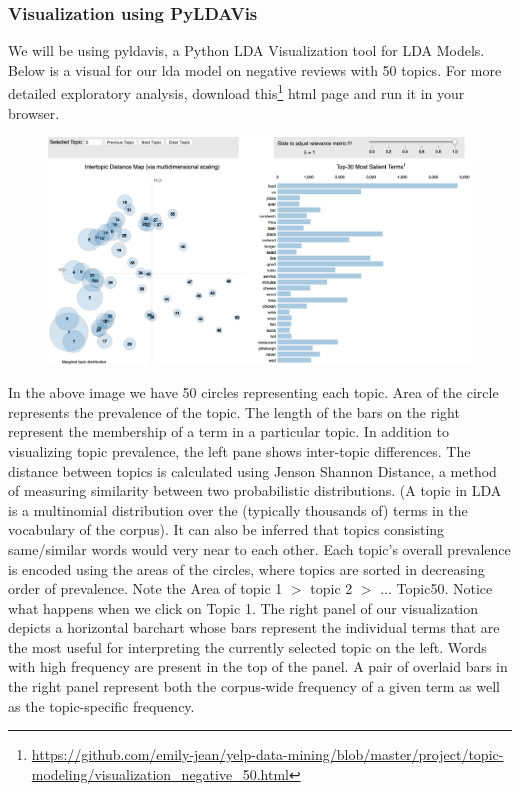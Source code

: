 \documentclass{neu_handout}
\begin{document}
\subsubsection*{Visualization using PyLDAVis}
We will be using pyldavis, a Python LDA Visualization tool for LDA Models. Below is a visual for our lda model on negative reviews with 50 topics. For more detailed exploratory analysis, download this\footnote{\url{https://github.com/emily-jean/yelp-data-mining/blob/master/project/topic-modeling/visualization_negative_50.html}} html page and run it in your browser.

\begin{figure}[h]
\centering
{
\includegraphics[width=0.6\linewidth]{first_image}
}
\end{figure}

In the above image we have 50 circles representing each topic. Area of the circle represents the prevalence of the topic. The length of the bars on the right represent the membership of a term in a particular topic. In addition to visualizing topic prevalence, the left pane shows inter-topic differences. The distance between topics is calculated using Jenson Shannon Distance, a method of measuring similarity between two probabilistic distributions. (A topic in LDA is a multinomial distribution over the (typically thousands of) terms in the vocabulary of the corpus). It can also be inferred that topics consisting same/similar words would very near to each other.
Each topic’s overall prevalence is encoded using the areas of the circles, where topics are sorted in decreasing order of prevalence. Note the Area of topic 1 $>$ topic 2 $>$ ... Topic50.
Notice what happens when we click on Topic 1. The right panel of our visualization depicts a horizontal barchart whose bars represent the individual terms that are the most useful for interpreting the currently selected topic on the left. Words with high frequency are present in the top of the panel. A pair of overlaid bars in the right panel represent both the corpus-wide frequency of a given term as well as the topic-specific frequency.
\end{document}

